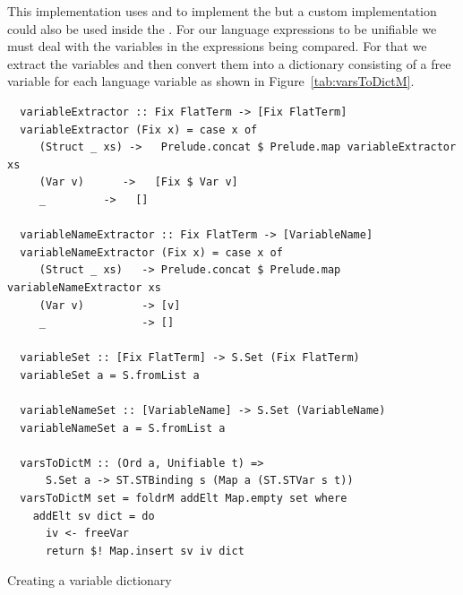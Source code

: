 \documentclass[thesis-solanki.tex]{subfiles}
\begin{document}
This implementation uses  and  to implement the 
but a custom implementation could also be used inside the .
For our language expressions to be unifiable we must deal with the variables in the expressions being compared.
For that we extract the variables and then convert them into a dictionary consisting of a free variable for each
language variable as shown in Figure~\ref{tab:varsToDictM}.

\begin{code-list}[H]
  \begin{verbatim}
  variableExtractor :: Fix FlatTerm -> [Fix FlatTerm]
  variableExtractor (Fix x) = case x of
     (Struct _ xs) ->   Prelude.concat $ Prelude.map variableExtractor xs
     (Var v)      ->   [Fix $ Var v]
     _         ->   []

  variableNameExtractor :: Fix FlatTerm -> [VariableName]
  variableNameExtractor (Fix x) = case x of
     (Struct _ xs)   -> Prelude.concat $ Prelude.map variableNameExtractor xs
     (Var v)         -> [v]
     _               -> []

  variableSet :: [Fix FlatTerm] -> S.Set (Fix FlatTerm)
  variableSet a = S.fromList a

  variableNameSet :: [VariableName] -> S.Set (VariableName)
  variableNameSet a = S.fromList a

  varsToDictM :: (Ord a, Unifiable t) =>
      S.Set a -> ST.STBinding s (Map a (ST.STVar s t))
  varsToDictM set = foldrM addElt Map.empty set where
    addElt sv dict = do
      iv <- freeVar
      return $! Map.insert sv iv dict
  \end{verbatim}
  \caption{Creating a variable dictionary}
  \label{tab:varsToDictM}
\end{code-list}
\end{document}
